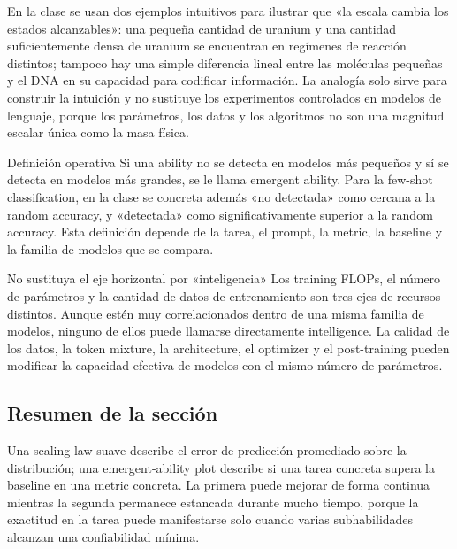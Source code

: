 
En la clase se usan dos ejemplos intuitivos para ilustrar que «la escala cambia los estados alcanzables»: una pequeña cantidad de uranium y una cantidad suficientemente densa de uranium se encuentran en regímenes de reacción distintos; tampoco hay una simple diferencia lineal entre las moléculas pequeñas y el DNA en su capacidad para codificar información. La analogía solo sirve para construir la intuición y no sustituye los experimentos controlados en modelos de lenguaje, porque los parámetros, los datos y los algoritmos no son una magnitud escalar única como la masa física.


\begin{importantbox}{Definición operativa}
Si una ability no se detecta en modelos más pequeños y sí se detecta en modelos más grandes, se le llama emergent ability. Para la few-shot classification, en la clase se concreta además «no detectada» como cercana a la random accuracy, y «detectada» como significativamente superior a la random accuracy. Esta definición depende de la tarea, el prompt, la metric, la baseline y la familia de modelos que se compara.
\end{importantbox}

\begin{warningbox}{No sustituya el eje horizontal por «inteligencia»}
Los training FLOPs, el número de parámetros y la cantidad de datos de entrenamiento son tres ejes de recursos distintos. Aunque estén muy correlacionados dentro de una misma familia de modelos, ninguno de ellos puede llamarse directamente intelligence. La calidad de los datos, la token mixture, la architecture, el optimizer y el post-training pueden modificar la capacidad efectiva de modelos con el mismo número de parámetros.
\end{warningbox}

\subsection{Resumen de la sección}

Una scaling law suave describe el error de predicción promediado sobre la distribución; una emergent-ability plot describe si una tarea concreta supera la baseline en una metric concreta. La primera puede mejorar de forma continua mientras la segunda permanece estancada durante mucho tiempo, porque la exactitud en la tarea puede manifestarse solo cuando varias subhabilidades alcanzan una confiabilidad mínima.
